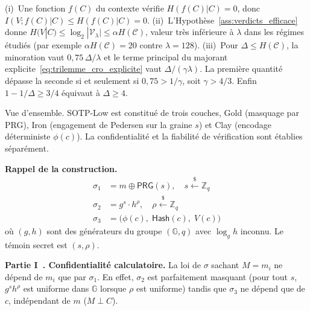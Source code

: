 \begin{sloppypar}
\begin{Preuve}
(i)~Une fonction $f(C)$ du contexte v\'erifie $H(f(C)|C) = 0$, donc
$I(V;f(C)|C) \leq H(f(C)|C) = 0$. (ii)~L'Hypoth\`ese~\ref{ass:verdicts_efficace} donne
$H(V|C) \leq \log_2|\mathcal{V}_\lambda| \leq \alpha H(\mathcal{C})$, valeur tr\`es
inf\'erieure \`a $\lambda$ dans les r\'egimes \'etudi\'es (par exemple $\alpha H(\mathcal{C}) = 20$
contre $\lambda = 128$). (iii)~Pour $\Delta \leq H(\mathcal{C})$, la minoration vaut
$0{,}75\,\Delta/\lambda$ et le terme principal du majorant
explicite~\eqref{eq:trilemme_cro_explicite} vaut $\Delta/(\gamma\lambda)$. La premi\`ere
quantit\'e d\'epasse la seconde si et seulement si $0{,}75 > 1/\gamma$, soit
$\gamma > 4/3$. Enfin $1 - 1/\Delta \geq 3/4$ \'equivaut \`a $\Delta \geq 4$.
\end{Preuve}

\begin{Preuve}\label{prv:saturation_sotp_low}

\begin{cmtEtape}{Vue d'ensemble.}
SOTP-Low est constitu\'e de trois couches, Gold (masquage par PRG),
Iron (engagement de Pedersen sur la graine $s$) et Clay (encodage
d\'eterministe $\phi(c)$). La confidentialit\'e et la fiabilit\'e de
v\'erification sont \'etablies s\'epar\'ement.
\end{cmtEtape}

\noindent\textbf{Rappel de la construction.}
\begin{align}
\sigma_1 &= m \oplus \mathsf{PRG}(s),
\quad s \xleftarrow{\$} \mathbb{Z}_q
\tag{couche Gold}\\
\sigma_2 &= g^{s} \cdot h^\rho,
\quad \rho \xleftarrow{\$} \mathbb{Z}_q
\tag{couche Iron}\\
\sigma_3 &= \bigl(\phi(c),\; \mathsf{Hash}(c),\; V(c)\bigr)
\tag{couche Clay}
\end{align}
o\`u $(g, h)$ sont des g\'en\'erateurs du groupe $(\mathbb{G}, q)$ avec
$\log_g h$ inconnu. Le t\'emoin secret est $(s, \rho)$.

\medskip
\noindent\textbf{Partie I~. Confidentialit\'e calculatoire.}
La loi de $\sigma$ sachant $M = m_i$ ne d\'epend de $m_i$ que par
$\sigma_1$. En effet, $\sigma_2$ est parfaitement masquant (pour tout $s$, $g^s h^\rho$
est uniforme dans $\mathbb{G}$ lorsque $\rho$ est uniforme) tandis que $\sigma_3$ ne
d\'epend que de $c$, ind\'ependant de $m$ ($M \perp C$).


\end{Preuve}
\end{sloppypar}
